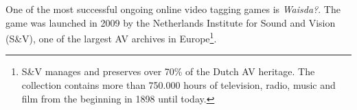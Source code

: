 One of the most successful ongoing online video tagging games is \textit{Waisda?}.
The game was launched in 2009 by the Netherlands Institute for Sound and Vision (S\&V), one of the largest AV archives in Europe\footnote{S\&V manages and preserves over 70\% of the Dutch AV heritage. The collection contains more than 750.000 hours of television, radio, music and film from the beginning in 1898 until today.}. %

